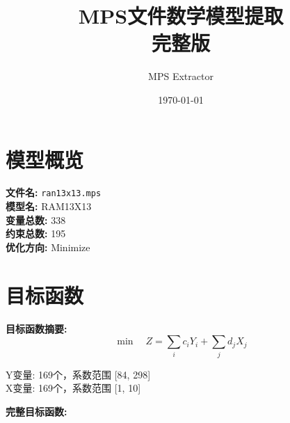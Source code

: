 \documentclass[a4paper,10pt]{article}
\title{MPS文件数学模型提取\\{\large 完整版}}
\author{MPS Extractor}
\date{\today}
\begin{document}
\maketitle
\tableofcontents
\newpage

\section{模型概览}

\textbf{文件名:} \texttt{ran13x13.mps} \\
\textbf{模型名:} RAM13X13 \\
\textbf{变量总数:} 338 \\
\textbf{约束总数:} 195 \\
\textbf{优化方向:} Minimize \\

\section{目标函数}

\textbf{目标函数摘要:}
\begin{equation}
\min \quad Z = \sum_{i} c_i Y_i + \sum_{j} d_j X_j
\end{equation}

Y变量: 169个，系数范围 [84, 298] \\
X变量: 169个，系数范围 [1, 10]

\textbf{完整目标函数:}
\end{document}
